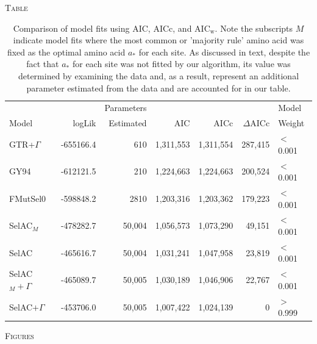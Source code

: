 \documentclass[12pt,letterpaper]{article}
\renewcommand{\section}[1]{%
\bigskip
\begin{center}
\begin{Large}
\normalfont\scshape #1
\medskip
\end{Large}
\end{center}}
\newcommand{\DeltaAICc}{\ensuremath{\Delta\text{AICc}}\xspace}
\newcommand{\AICw}{\ensuremath{\text{AIC}_\text{w}}\xspace}
\newcommand{\selac}{SelAC\xspace}
\newcommand{\selacplusgamma}{SelAC$+\Gamma$\xspace}
\newcommand{\selacmaj}{SelAC$_{M}$\xspace}
\newcommand{\selacmajplusgamma}{SelAC$_{M}+\Gamma$\xspace}
\newcommand{\aopt}{\ensuremath{a_*}\xspace}
\begin{document}
\clearpage

\section{Table}

  \begin{table}[H]
    \begin{tabular}{lrrrrrl}
                				&		   &Parameters &              &              &            &    Model\\
      Model                 	& logLik   & Estimated &           AIC&          AICc&  \DeltaAICc&  Weight\\\hline
      GTR+$\Gamma$        		& -655166.4&        610& 	 1,311,553& 	1,311,554&     287,415&	$<$0.001\\
      GY94                  	& -612121.5&        210& 	 1,224,663& 	1,224,663&     200,524&	$<$0.001\\
      FMutSel0              	& -598848.2&       2810& 	 1,203,316& 	1,203,362&     179,223&	$<$0.001\\
      \selacmaj          	    & -478282.7&       50,004&   1,056,573&     1,073,290&      49,151&	$<$0.001\\
      \selac                    & -465616.7&       50,004&   1,031,241&     1,047,958&      23,819&	$<$0.001\\
      \selacmajplusgamma 	    & -465089.7&       50,005&   1,030,189&     1,046,906&      22,767& $<$0.001\\
      \selacplusgamma 	        & -453706.0&       50,005&   1,007,422&     1,024,139&           0& $>$0.999\\
    \end{tabular}
    \caption{Comparison of model fits using AIC, AICc, and \AICw.
Note the subscripts $M$ indicate model fits where the most common or 'majority rule' amino acid was fixed as the optimal amino acid \aopt for each site.
As discussed in text, despite the fact that \aopt for each site was not fitted by our algorithm, its value was determined by examining the data and, as a result, represent an additional parameter estimated from the data and are accounted for in our table.
}
    \label{table:modelFits}
\end{table}



\clearpage %

\section{Figures}
\end{document}
